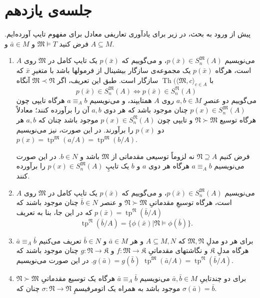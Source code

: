 \documentclass[12pt,a4paper]{article}
\theoremstyle{colorhead}
\DeclareMathOperator{\Th}{Th}
\DeclareMathOperator{\tp}{tp}
\begin{document}
\section{جلسه‌ی یازدهم}
پیش از ورود به بحث، در زیر برای یادآوری تعاریفی معادل برای مفهوم تایپ آورده‌ایم.
فرض کنید
$\mathfrak{M}\models T$
و
$\bar{a}\in M$
و
$A\subseteq M$.
\begin{enumerate}
\item 
می‌نویسیم
$p(\bar{x})\in S^\mathfrak{M}_n(A)$،
و می‌گوییم که
$p(\bar{x})$
یک تایپ کامل در
$\mathfrak{M}$
روی
$A$
است، هرگاه 
$p(\bar{x})$
یک مجموعه‌ی سازگار بیشینال از فرمولها باشد با متغیرِ
$\bar{x}$
که با
$\Th(\langle \mathfrak{M},c\rangle_{c\in A}$
سازگار است. طبق این تعریف،‌ اگر
$\mathfrak{M}\prec \mathfrak{N}$
آنگاه 
\[
p(\bar{x})\in S^\mathfrak{M}_n(A)\Leftrightarrow p(\bar{x})\in S^\mathfrak{N}_n(A)
\]
می‌گوییم دو عنصرِ
$a,b\in M$
روی
$A$
همتایپند، و می‌نویسیم
$a\equiv_{A}b$
هرگاه
تایپی چون
$p(x)\in S^\mathfrak{M}_n(A)$
چنان موجود باشد که هر دوی
$a,b$
آن را برآورده کنند؛ معادلاً هرگاه
توسیع
$\mathfrak{N}\succ \mathfrak{M}$
و تایپی چون
$p(x)\in S^\mathfrak{N}_n(A)$
موجود باشد چنان که
$a,b$
هر دو 
$p(x)$
را برآورند. در این صورت،‌ نیز می‌نویسیم
$p(x)=\tp^\mathfrak{M}(a/A)=\tp^\mathfrak{M}(b/A)$.
\par 
فرض کنیم
$\mathfrak{N}\supseteq A$
نه لزوماً
توسیعی مقدماتی از
$\mathfrak{M}$
باشد و 
$b\in  N$.
در این صورت می‌نویسیم
$a\equiv_A b$
هرگاه هر دوی 
$a$
و
$b$
یک تایپِ
$p(x)\in S^\mathfrak{M}_n(A)$
را برآورده کنند. 
\item 
می‌نویسیم
$p(\bar{x})\in S^\mathfrak{M}_n(A)$،
و می‌گوییم که
$p(\bar{x})$
یک تایپ کامل در
$\mathfrak{M}$
روی
$A$
است، هرگاه توسیعِ مقدماتیِ
$\mathfrak{N}\succ \mathfrak{M}$
و عنصر
$\bar{b}\in N$
چنان موجود باشند که
$p(\bar{x})=\tp^\mathfrak{N}(\bar{b}/A)$
که در این جا، بنا به تعریف
\[
\tp^\mathfrak{N}(\bar{b}/A)=\{\phi(\bar{x})|\mathfrak{N}\models \phi(\bar{b})\}.
\]
\item 
برای هر دو مدلِ
$\mathfrak{M},\mathfrak{N}$
که 
$A\subseteq M,N$
و هر
$\bar{a}\in M$
و
$\bar{b}\in N$
تعریف می‌کنیم
$\bar{a}\equiv_A \bar{b}$
هرگاه مدلِ
$\mathfrak{K}$
و نگاشتهای مقدماتیِ
$f:\mathfrak{M}\to \mathfrak{K}$
و
$g:\mathfrak{N}\to \mathfrak{K}$
چنان موجود باشند که 
$g(\bar{a})=g(\bar{b})$.
در این صورت می‌نویسیم
$\tp^\mathfrak{M}(\bar{a}/A)=\tp^\mathfrak{N}(\bar{b}/A)$.
\item 
برای دو چندتاییِ
$\bar{a},\bar{b}\in M$
می‌نویسیم 
$\bar{a}\equiv_A\bar{b}$
هرگاه یک توسیع مقدماتیِ
$\mathfrak{N}\succ \mathfrak{M}$
موجود باشد به همراه یک اتومرفیسمِ
$\sigma:\mathfrak{N}\to \mathfrak{N}$
چنان که
$\sigma(\bar{a})=\bar{b}$.
\end{enumerate}
\end{document}
